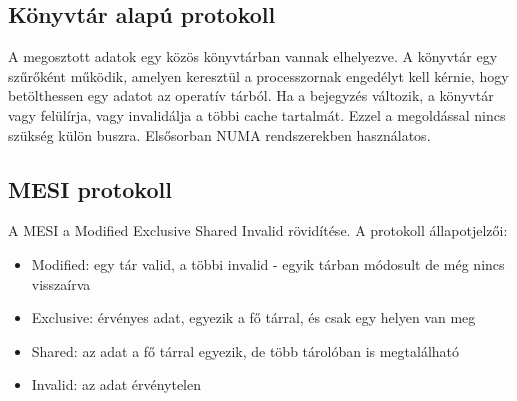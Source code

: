 \subsection{Könyvtár alapú protokoll}
A megosztott adatok egy közös könyvtárban vannak elhelyezve.
A könyvtár egy szűrőként működik, amelyen keresztül a processzornak engedélyt kell kérnie, hogy betölthessen egy adatot az operatív tárból.
Ha a bejegyzés változik, a könyvtár vagy felülírja, vagy invalidálja a többi cache tartalmát.
Ezzel a megoldással nincs szükség külön buszra.
Elsősorban NUMA rendszerekben használatos.

\subsection{MESI protokoll}
A MESI a Modified Exclusive Shared Invalid rövidítése. A protokoll állapotjelzői:
\begin{itemize}
    \item Modified: egy tár valid, a többi invalid - egyik tárban módosult de még nincs visszaírva
    \item Exclusive: érvényes adat, egyezik a fő tárral, és csak egy helyen van meg
    \item Shared: az adat a fő tárral egyezik, de több tárolóban is megtalálható
    \item Invalid: az adat érvénytelen
\end{itemize}